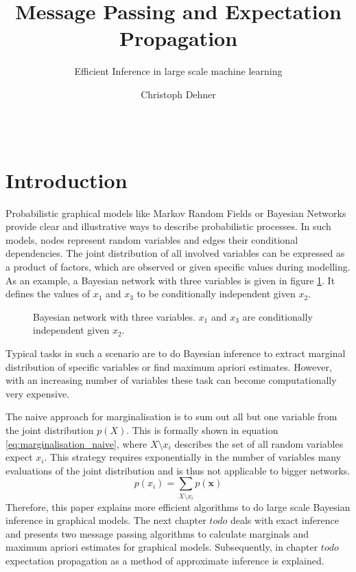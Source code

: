 \documentclass{sigkdd}
\title{Message Passing and Expectation Propagation}
\subtitle{Efficient Inference in large scale machine learning}
\author{
\alignauthor Christoph Dehner \\
\affaddr{Department of Informatics}\\
\affaddr{Technische Universit\"at M\"unchen}\\
\email{dehner@in.tum.de}
}
\begin{document}
\maketitle

\begin{abstract}
\blindtext
\end{abstract}

\section{Introduction}
Probabilistic graphical models like Markov Random Fields or Bayesian Networks provide clear and illustrative ways to describe probabilistic processes. In such models, nodes represent random variables and edges their conditional dependencies. The joint distribution of all involved variables can be expressed as a product of factors, which are observed or given specific values during modelling. As an example, a Bayesian network with three variables is given in figure \ref{fig:BN}. It defines the values of $x_1$ and $x_3$ to be conditionally independent given $x_2$.
\begin{figure}[h]
	\centering
	\caption{Bayesian network with three variables. $x_1$ and $x_3$ are conditionally independent given $x_2$.}\label{fig:BN}
\end{figure}

Typical tasks in such a scenario are to do Bayesian inference to extract marginal distribution of specific variables or find maximum apriori estimates. However, with an increasing number of variables these task can become computationally very expensive. 

The naive approach for marginalisation is to sum out all but one variable from the joint distribution $p(X)$. This is formally shown in equation \ref{eq:marginalisation_naive}, where $X \setminus x_i$ describes the set of all random variables expect $x_i$.
This strategy requires exponentially in the number of variables many evaluations of the joint distribution and is thus not applicable to bigger networks.
\begin{equation}\label{eq:marginalisation_naive}
p(x_i)= \sum_{X \setminus x_i} p(\mathbf{x})
\end{equation}
Therefore, this paper explains more efficient algorithms to do large scale Bayesian inference in graphical models. The next chapter $todo$ deals with exact inference and presents two message passing algorithms to calculate marginals and maximum apriori estimates for graphical models. Subsequently, in chapter $todo$ expectation propagation as a method of approximate inference is explained.
\end{document}

